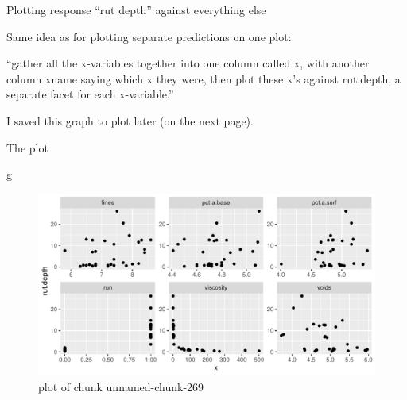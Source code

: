 \documentclass[ignorenonframetext,]{beamer}
\newenvironment{Shaded}{\begin{snugshade}}{\end{snugshade}}
\newcommand{\DataTypeTok}[1]{\textcolor[rgb]{0.13,0.29,0.53}{#1}}
\newcommand{\KeywordTok}[1]{\textcolor[rgb]{0.13,0.29,0.53}{\textbf{#1}}}
\newcommand{\NormalTok}[1]{#1}
\newcommand{\OperatorTok}[1]{\textcolor[rgb]{0.81,0.36,0.00}{\textbf{#1}}}
\newcommand{\StringTok}[1]{\textcolor[rgb]{0.31,0.60,0.02}{#1}}
\begin{document}
\begin{frame}[fragile]{Plotting response ``rut depth'' against
everything else}
\protect\hypertarget{plotting-response-rut-depth-against-everything-else}{}

Same idea as for plotting separate predictions on one plot:

\begin{Shaded}
\end{Shaded}

``gather all the x-variables together into one column called x, with
another column xname saying which x they were, then plot these x's
against rut.depth, a separate facet for each x-variable.''

I saved this graph to plot later (on the next page).

\end{frame}

\begin{frame}[fragile]{The plot}
\protect\hypertarget{the-plot-2}{}

\begin{Shaded}
\begin{Highlighting}[]
\NormalTok{g}
\end{Highlighting}
\end{Shaded}

\begin{figure}
\centering
\includegraphics{figure/unnamed-chunk-269-1.pdf}
\caption{plot of chunk unnamed-chunk-269}
\end{figure}

\end{frame}
\end{document}
